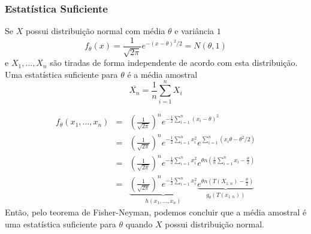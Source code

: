 \begin{frame}[allowframebreaks]
  \frametitle{Estatística Suficiente}
  \begin{example}
        Se $X$ possui distribuição normal com média $\theta$ e variância $1$
        \begin{equation}
        f_\theta (x) = \frac{1}{\sqrt{2\pi}} e^{-(x-\theta)^2/2} = N(\theta,1)
        \end{equation}
        e $X_1,\ldots,X_n$ são tiradas de forma independente de acordo com esta distribuição.
        Uma estatística suficiente para $\theta$ é a média amostral
        \begin{equation}
        \overline{X_n} = \frac{1}{n} \sum_{i=1}^{n} X_i
        \end{equation}

        \examplebreak
	\vspace{-6ex}
        \begin{eqnarray}
        f_\theta (x_1,\ldots,x_n) &=& \left( \frac{1}{\sqrt{2\pi}} \right)^n e^{-\frac{1}{2} \sum_{i=1}^n (x_i - \theta)^2} \nonumber \\
                &=& \left( \frac{1}{\sqrt{2\pi}} \right)^n e^{-\frac{1}{2} \sum_{i=1}^n x_i^2} e^{\sum_{i=1}^n (x_i \theta - \theta^2/2)} \nonumber \\
                &=& \left( \frac{1}{\sqrt{2\pi}} \right)^n e^{-\frac{1}{2} \sum_{i=1}^n x_i^2} e^{\theta n \left( \frac{1}{n} \sum_{i=1}^n x_i - \frac{\theta}{2} \right)} \nonumber \\
                &=& \underbrace{ \left( \frac{1}{\sqrt{2\pi}} \right)^n e^{-\frac{1}{2} \sum_{i=1}^n x_i^2} }_{h(x_1,\ldots,x_n)} \underbrace{ e^{\theta n \left( T(X_{1:n}) - \frac{\theta}{2} \right)} }_{g_\theta (T(x_{1:n}))}
        \end{eqnarray}
        Então, pelo teorema de Fisher-Neyman, podemos concluir que a média amostral é uma estatística
        suficiente para $\theta$ quando $X$ possui distribuição normal.
  \end{example}
\end{frame}

